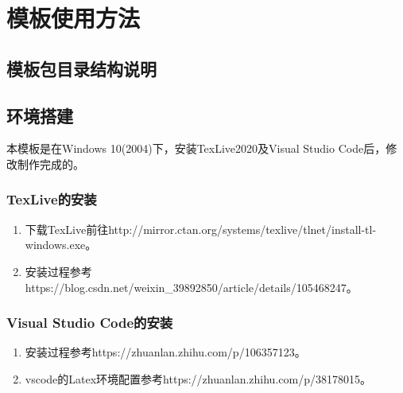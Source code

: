 \chapter{模板使用方法}
\section{模板包目录结构说明}
\section{环境搭建}
本模板是在Windows 10(2004)下，安装TexLive2020及Visual Studio Code后，修改制作完成的。
\subsection{TexLive的安装}
\begin{enumerate}
    \item 下载TexLive前往http://mirror.ctan.org/systems/texlive/tlnet/install-tl-windows.exe。
    \item 安装过程参考https://blog.csdn.net/weixin\_39892850/article/details/105468247。
\end{enumerate}
\subsection{Visual Studio Code的安装}
\begin{enumerate}
    \item 安装过程参考https://zhuanlan.zhihu.com/p/106357123。
    \item vscode的Latex环境配置参考https://zhuanlan.zhihu.com/p/38178015。
\end{enumerate}

